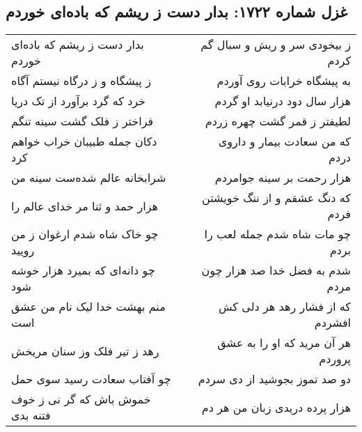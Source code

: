 \begin{center}
\section*{غزل شماره ۱۷۲۲: بدار دست ز ریشم که باده‌ای خوردم}
\label{sec:1722}
\begin{longtable}{l p{0.5cm} r}
بدار دست ز ریشم که باده‌ای خوردم
&&
ز بیخودی سر و ریش و سبال گم کردم
\\
ز پیشگاه و ز درگاه نیستم آگاه
&&
به پیشگاه خرابات روی آوردم
\\
خرد که گرد برآورد از تک دریا
&&
هزار سال دود درنیابد او گردم
\\
فراختر ز فلک گشت سینه تنگم
&&
لطیفتر ز قمر گشت چهره زردم
\\
دکان جمله طبیبان خراب خواهم کرد
&&
که من سعادت بیمار و داروی دردم
\\
شرابخانه عالم شده‌ست سینه من
&&
هزار رحمت بر سینه جوامردم
\\
هزار حمد و ثنا مر خدای عالم را
&&
که دنگ عشقم و از ننگ خویشتن فردم
\\
چو خاک شاه شدم ارغوان ز من رویید
&&
چو مات شاه شدم جمله لعب را بردم
\\
چو دانه‌ای که بمیرد هزار خوشه شود
&&
شدم به فضل خدا صد هزار چون مردم
\\
منم بهشت خدا لیک نام من عشق است
&&
که از فشار رهد هر دلی کش افشردم
\\
رهد ز تیر فلک وز سنان مریخش
&&
هر آن مرید که او را به عشق پروردم
\\
چو آفتاب سعادت رسید سوی حمل
&&
دو صد تموز بجوشید از دی سردم
\\
خموش باش که گر نی ز خوف فتنه بدی
&&
هزار پرده دریدی زبان من هر دم
\\
\end{longtable}
\end{center}
